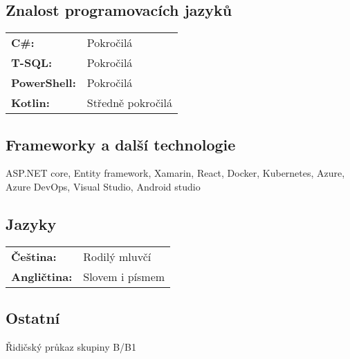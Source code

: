 \documentclass[a4paper]{article}
\begin{document}
\subsection*{Znalost programovacích jazyků}
\begin{tabular}{>{\bfseries}l l}
    C\#:        & Pokročilá \\
    T-SQL:      & Pokročilá \\
    PowerShell: & Pokročilá \\
    Kotlin:     & Středně pokročilá \\
\end{tabular}

\subsection*{Frameworky a další technologie}
ASP.NET core, Entity framework, Xamarin, React, Docker, Kubernetes, Azure, Azure DevOps, Visual Studio, Android studio

\subsection*{Jazyky}
\begin{tabular}{>{\bfseries}l l}
    Čeština: & Rodilý mluvčí \\
    Angličtina: & Slovem i písmem
\end{tabular}

\subsection*{Ostatní}
Řidičský průkaz skupiny B/B1
\end{document}
